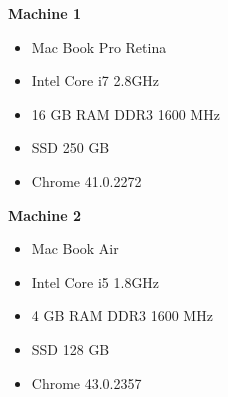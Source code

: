 \textbf{Machine 1}
\begin{itemize}
  \item Mac Book Pro Retina
  \item Intel Core i7 2.8GHz
  \item 16 GB RAM DDR3 1600 MHz
  \item SSD 250 GB
  \item Chrome 41.0.2272
\end{itemize}

\textbf{Machine 2}
\begin{itemize}
  \item Mac Book Air
  \item Intel Core i5 1.8GHz
  \item 4 GB RAM DDR3 1600 MHz
  \item SSD 128 GB
  \item Chrome 43.0.2357
\end{itemize}


\pagebreak